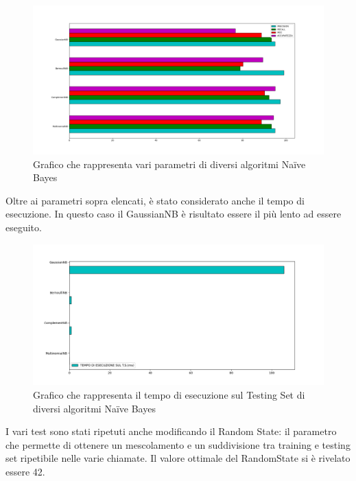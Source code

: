 \documentclass{report}
\begin{document}
  
        \begin{figure}[h]
            \centering
            \includegraphics[width =\textwidth]{immagini/graficoBuono.png}
            \caption{Grafico che rappresenta vari parametri di diversi algoritmi Naïve Bayes}

        \end{figure}
        
        Oltre ai parametri sopra elencati, è stato considerato anche il tempo di esecuzione.
        In questo caso il GaussianNB è risultato essere il più lento ad essere eseguito.
        \newpage
        
        \begin{figure}[h]
            \centering
            \includegraphics[width =\textwidth]{immagini/graficoEsecuzione.png}
            \caption{Grafico che rappresenta il tempo di esecuzione sul Testing Set di diversi algoritmi Naïve Bayes}
        \end{figure}

    I vari test sono stati ripetuti anche modificando il Random State: il parametro che permette di ottenere un mescolamento e 
    un suddivisione tra training e testing set ripetibile nelle varie chiamate.
    Il valore ottimale del RandomState si è rivelato essere 42.
    
\end{document}

